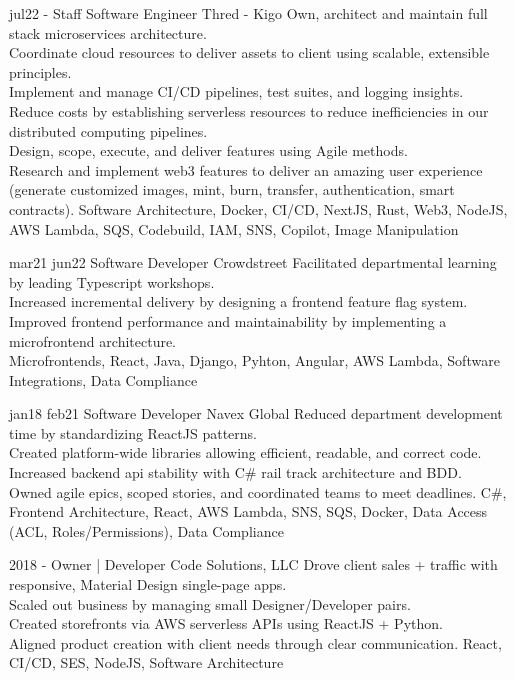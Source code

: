\documentclass[]{friggeri-cv}
\begin{document}
\begin{entrylist}
  \entry
    {jul22 -}
    {Staff Software Engineer}
    {Thred - Kigo}
    {
      Own, architect and maintain full stack microservices architecture. \\
      Coordinate cloud resources to deliver assets to client using scalable, extensible principles. \\
      Implement and manage CI/CD pipelines, test suites, and logging insights. \\
      Reduce costs by establishing serverless resources to reduce inefficiencies in our distributed computing pipelines. \\
      Design, scope, execute, and deliver features using Agile methods. \\
      Research and implement web3 features to deliver an amazing user experience (generate customized images, mint, burn, transfer, authentication, smart contracts). 
      Software Architecture, Docker, CI/CD, NextJS, Rust, Web3, NodeJS, AWS Lambda, SQS, Codebuild, IAM, SNS, Copilot, Image Manipulation
    }


  \entry 
    {mar21 jun22}
    {Software Developer}
    {Crowdstreet}
    {
    Facilitated departmental learning by leading Typescript workshops.\\
    Increased incremental delivery by designing a frontend feature flag system. \\
    Improved frontend performance and maintainability by implementing a microfrontend architecture.\\
    Microfrontends, React, Java, Django, Pyhton, Angular, AWS Lambda, Software Integrations, Data Compliance
    }
  

  \entry 
    {jan18 feb21}
    {Software Developer}
    {Navex Global}
    {
    Reduced department development time by standardizing ReactJS patterns.\\
    Created platform-wide libraries allowing efficient, readable, and correct code.\\
    Increased backend api stability with C\# rail track architecture and BDD.\\
    Owned agile epics, scoped stories, and coordinated teams to meet deadlines.
    C#, Frontend Architecture, React, AWS Lambda, SNS, SQS, Docker, Data Access (ACL, Roles/Permissions), Data Compliance
    }
  
  \entry 
    {2018 - }
    {Owner | Developer}
    {Code Solutions, LLC}
    {
    Drove client sales + traffic with responsive, Material Design single-page apps. \\
    Scaled out business by managing small Designer/Developer pairs.\\
    Created storefronts via AWS serverless APIs using ReactJS + Python. \\
    Aligned product creation with client needs through clear communication.
    React, CI/CD, SES, NodeJS, Software Architecture
    }


\end{entrylist}
\end{document}
